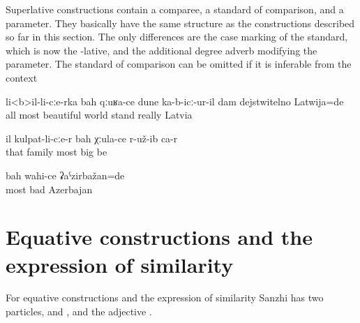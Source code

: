 Superlative constructions contain a comparee, a standard of comparison, and a parameter. They basically have the same structure as the constructions described so far in this section. The only differences are the case marking of the standard, which is now the -lative, and the additional degree adverb modifying the parameter. The standard of comparison can be omitted if it is inferable from the context
%
\begin{exe}
	\ex	\label{ex:‎‎‎Among all as the most beautiful (country) seemed to me Latvia}
	\gll	li<b>il-li-cːe-rka	bah	qːuʁa-ce	dune	ka-b-icː-ur-il	dam	dejstwitelno	Latwija=de	\\
		all	most	beautiful	world	stand		really	Latvia	\\
	\glt	{}

	\ex	\label{ex:‎‎‎She was the oldest within her family.}
	\gll	il	kulpat-li-cːe-r	bah	χːula-ce	r-už-ib	ca-r\\
		that	family	most	big	be	\\
	\glt	{}

	\ex	\label{ex:‎‎‎The worst (place) was Azerbajan}
	\gll	bah	wahi-ce	ʡaˁzirbažan=de\\
		most	bad	Azerbajan\\
	\glt	{}
\end{exe}



\section{Equative constructions and the expression of similarity}
\label{sec:Equative constructions and the expression of similarity}

For equative constructions and the expression of similarity Sanzhi has two particles,  and  , and the adjective  .

